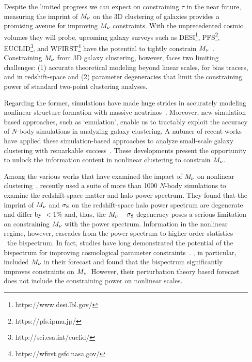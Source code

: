 Despite the limited progress we can expect on constraining $\tau$ in the
near future, measuring the imprint of $M_\nu$ on the 3D clustering of galaxies
provides a promising avenue for improving $M_\nu$ constraints. With the
unprecedented cosmic volumes they will probe, upcoming galaxy surveys 
such as DESI\footnote{https://www.desi.lbl.gov/}, PFS\footnote{https://pfs.ipmu.jp/}, 
EUCLID\footnote{http://sci.esa.int/euclid/}, and WFIRST\footnote{https://wfirst.gsfc.nasa.gov/} 
have the potential to tightly constrain $M_\nu$~\citep{audren2013, font-ribera2014, petracca2016, sartoris2016, boyle2018}.
Constraining $M_\nu$ from 3D galaxy clustering, however, faces two limiting
challenges: (1) accurate theoretical modeling beyond linear scales, for bias tracers, and
in redshift-space and (2) parameter degeneracies that limit the constraining
power of standard two-point clustering analyses. 

Regarding the former, simulations have made huge strides in accurately modeling 
nonlinear structure formation with massive neutrinos~\citep[\emph{e.g.}][]{brandbyge2008, 
villaescusa-navarro2013, castorina2015, adamek2017, emberson2017, banerjee2018, 
villaescusa-navarro2018, villaescusa-navarro2019}. Moreover, new simulation-based
approaches, such as `emulation', enable us to tractably exploit the accuracy of 
$N$-body simulations in analyzing galaxy clustering. A nubmer of recent works have
applied these simulation-based approaches to analyze small-scale galaxy
clustering with remarkable success~\citep[\eg][]{heitmann2009, kwan2015,
euclidcollaboration2018, lange2019, zhai2019, wibking2019}. These developments 
present the opportunity to unlock the information content in nonlinear
clustering to constrain $M_\nu$. 

Among the various works that have examined the impact of $M_\nu$ on nonlinear 
clustering~\citep[\eg][]{brandbyge2008, saito2008, wong2008, saito2009,
viel2010, agarwal2011, marulli2011, bird2012, castorina2015, banerjee2016,
upadhye2016}, \cite{villaescusa-navarro2018} recently used a suite of more than 1000
$N$-body simulations to examine the redshift-space matter and halo power spectrum. 
They found that the imprint of $M_\nu$ and $\sigma_8$ on the redshift-space halo power
spectrum are degenerate and differ by $< 1\%$ and, thus, the $M_\nu$ -- $\sigma_8$ 
degeneracy poses a serious limitation on constraining $M_\nu$ with the power spectrum. 
Information in the nonlinear regime, however, cascades from the power spectrum to 
higher-order statistics --- \eg~the bispectrum. In fact, studies have long
demonstrated the potential of the bispectrum for improving cosmological parameter 
constraints~\citep{sefusatti2005, sefusattti2006, chan2017, yankelevich2019}. 
\cite{chudaykin2019}, in particular, included $M_\nu$ in their forecast and
found that the bispectrum significantly improves constraints on $M_\nu$.
However, their perturbation theory based forecast does not include the
constraining power on nonlinear scales. 


